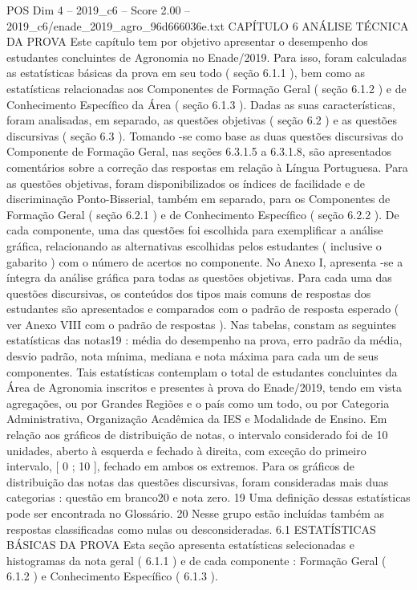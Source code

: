 \begin{textsample}{POS Dim 4 – 2019\_c6 – Score 2.00 – 2019\_c6/enade\_2019\_agro\_96d666036e.txt}  \label{ex:f4_pos_098}
CAPÍTULO 6 ANÁLISE TÉCNICA DA PROVA Este capítulo tem por objetivo apresentar o desempenho dos estudantes concluintes de Agronomia no Enade/2019.
Para isso, foram calculadas as estatísticas básicas da prova em seu todo ( seção 6.1.1 ), bem como as estatísticas relacionadas aos Componentes de Formação Geral ( seção 6.1.2 ) e de Conhecimento Específico da Área ( seção 6.1.3 ).
Dadas as suas características, foram analisadas, em separado, as questões objetivas ( seção 6.2 ) e as questões discursivas ( seção 6.3 ).
Tomando -se como base as duas questões discursivas do Componente de Formação Geral, nas seções 6.3.1.5 a 6.3.1.8, são apresentados comentários sobre a correção das respostas em relação à Língua Portuguesa.
Para as questões objetivas, foram disponibilizados os índices de facilidade e de discriminação Ponto-Bisserial, também em separado, para os Componentes de Formação Geral ( seção 6.2.1 ) e de Conhecimento Específico ( seção 6.2.2 ).
De cada componente, uma das questões foi escolhida para exemplificar a análise gráfica, relacionando as alternativas escolhidas pelos estudantes ( inclusive o gabarito ) com o número de acertos no componente.
No Anexo I, apresenta -se a íntegra da análise gráfica para todas as questões objetivas.
Para cada uma das questões discursivas, os conteúdos dos tipos mais comuns de respostas dos estudantes são apresentados e comparados com o padrão de resposta esperado ( ver Anexo VIII com o padrão de respostas ).
Nas tabelas, constam as seguintes estatísticas das notas19 : média do desempenho na prova, erro padrão da média, desvio padrão, nota mínima, mediana e nota máxima para cada um de seus componentes.
Tais estatísticas contemplam o total de estudantes concluintes da Área de Agronomia inscritos e presentes à prova do Enade/2019, tendo em vista agregações, ou por Grandes Regiões e o país como um todo, ou por Categoria Administrativa, Organização Acadêmica da IES e Modalidade de Ensino.
Em relação aos gráficos de distribuição de notas, o intervalo considerado foi de 10 unidades, aberto à esquerda e fechado à direita, com exceção do primeiro intervalo, [ 0 ; 10 ], fechado em ambos os extremos.
Para os gráficos de distribuição das notas das questões discursivas, foram consideradas mais duas categorias : questão em branco20 e nota zero. 19 Uma definição dessas estatísticas pode ser encontrada no Glossário. 20 Nesse grupo estão incluídas também as respostas classificadas como nulas ou desconsideradas. 6.1 ESTATÍSTICAS BÁSICAS DA PROVA Esta seção apresenta estatísticas selecionadas e histogramas da nota geral ( 6.1.1 ) e de cada componente : Formação Geral ( 6.1.2 ) e Conhecimento Específico ( 6.1.3 ).

\end{textsample}
